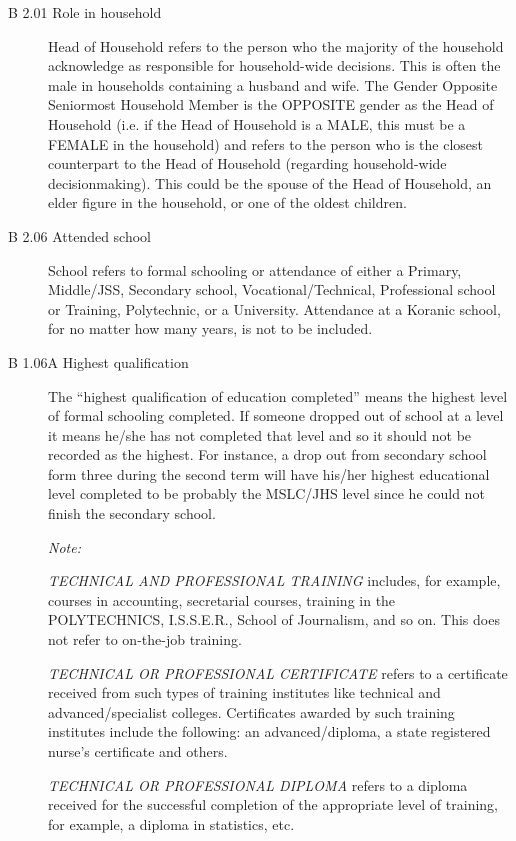 \documentclass[a4paper]{refart}
\begin{document}
\begin{description}
\item[B 2.01 Role in household] Head of Household refers to the person who the majority of the household acknowledge as responsible for household-wide decisions. This is often the male in households containing a husband and wife. The Gender Opposite Seniormost Household Member is the OPPOSITE gender as the Head of Household (i.e. if the Head of Household is a MALE, this must be a FEMALE in the household) and refers to the person who is the closest counterpart to the Head of Household (regarding household-wide decisionmaking). This could be the spouse of the Head of Household, an elder figure in the household, or one of the oldest children.

\item[B 2.06 Attended school] School refers to formal schooling or attendance of either a Primary, Middle/JSS, Secondary school, Vocational/Technical, Professional school or Training, Polytechnic, or a University. Attendance at a Koranic school, for no matter how many years, is not to be included.

\item[B 1.06A Highest qualification] The ``highest qualification of education completed'' means the highest level of formal schooling completed. If someone dropped out of school at a level it means he/she has not completed that level and so it should not be recorded as the highest. For instance, a drop out from secondary school form three during the second term will have his/her highest educational level completed to be probably the MSLC/JHS level since he could not finish the secondary school.

\textit{Note:}

\textit{TECHNICAL AND PROFESSIONAL TRAINING} includes, for example, courses in accounting, secretarial courses, training in the POLYTECHNICS, I.S.S.E.R., School of Journalism, and so on. This does not refer to on-the-job training.

\textit{TECHNICAL OR PROFESSIONAL CERTIFICATE} refers to a certificate received from such types of training institutes like technical and advanced/specialist colleges. Certificates awarded by such training institutes include the following: an advanced/diploma, a state registered nurse's certificate and others.

\textit{TECHNICAL OR PROFESSIONAL DIPLOMA} refers to a diploma received for the successful completion of the appropriate level of training, for example, a diploma in statistics, etc.

\end{description}
\end{document}
